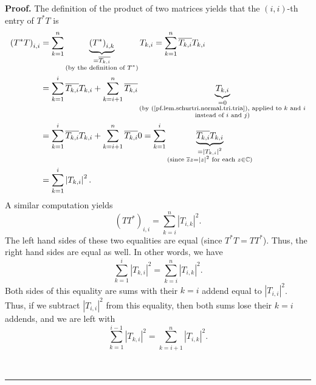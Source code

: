 \documentclass[numbers=enddot,12pt,final,onecolumn,notitlepage]{scrartcl}%
\numberwithin{exer}{subsection}
\theoremstyle{definition}
\newenvironment{proof}[1][Proof]{\noindent\textbf{#1.} }{\ \rule{0.5em}{0.5em}}
\let\sumnonlimits\sum
\renewcommand{\sum}{\sumnonlimits\limits}
\begin{document}
\begin{proof}
The definition of the product of two matrices yields that the $\left(
i,i\right)  $-th entry of $T^{\ast}T$ is%
\begin{align*}
\left(  T^{\ast}T\right)  _{i,i}  &  =\sum_{k=1}^{n}\underbrace{\left(
T^{\ast}\right)  _{i,k}}_{\substack{=\overline{T_{k,i}}\\\text{(by the
definition of }T^{\ast}\text{)}}}T_{k,i}=\sum_{k=1}^{n}\overline{T_{k,i}%
}T_{k,i}\\
&  =\sum_{k=1}^{i}\overline{T_{k,i}}T_{k,i}+\sum_{k=i+1}^{n}\overline{T_{k,i}%
}\underbrace{T_{k,i}}_{\substack{=0\\\text{(by
(\ref{pf.lem.schurtri.normal.tri.tria}), applied to }k\text{ and
}i\\\text{instead of }i\text{ and }j\text{)}}}\\
&  =\sum_{k=1}^{i}\overline{T_{k,i}}T_{k,i}+\sum_{k=i+1}^{n}\overline{T_{k,i}%
}0=\sum_{k=1}^{i}\underbrace{\overline{T_{k,i}}T_{k,i}}_{\substack{=\left\vert
T_{k,i}\right\vert ^{2}\\\text{(since }\overline{z}z=\left\vert z\right\vert
^{2}\text{ for each }z\in\mathbb{C}\text{)}}}\\
&  =\sum_{k=1}^{i}\left\vert T_{k,i}\right\vert ^{2}.
\end{align*}
A similar computation yields%
\[
\left(  TT^{\ast}\right)  _{i,i}=\sum_{k=i}^{n}\left\vert T_{i,k}\right\vert
^{2}.
\]
The left hand sides of these two equalities are equal (since $T^{\ast
}T=TT^{\ast}$). Thus, the right hand sides are equal as well. In other words,
we have%
\[
\sum_{k=1}^{i}\left\vert T_{k,i}\right\vert ^{2}=\sum_{k=i}^{n}\left\vert
T_{i,k}\right\vert ^{2}.
\]
Both sides of this equality are sums with their $k=i$ addend equal to
$\left\vert T_{i,i}\right\vert ^{2}$. Thus, if we subtract $\left\vert
T_{i,i}\right\vert ^{2}$ from this equality, then both sums lose their $k=i$
addends, and we are left with%
\begin{equation}
\sum_{k=1}^{i-1}\left\vert T_{k,i}\right\vert ^{2}=\sum_{k=i+1}^{n}\left\vert
T_{i,k}\right\vert ^{2}. \label{pf.lem.schurtri.normal.tri.sum=sum}%
\end{equation}



\end{proof}
\end{document}
